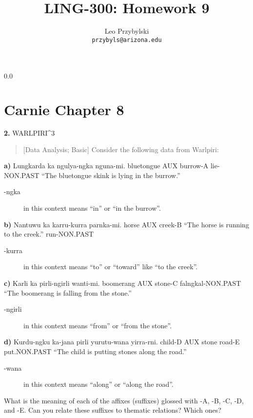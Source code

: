\documentclass[11pt,notitlepage]{article}
\title{LING-300: Homework 9}
\author{Leo Przybylski\\
\texttt{przybyls@arizona.edu}}
\newcommand{\question}[2]{\textbf{#1.} #2}
\newcommand{\subquestion}[2]{\par\hspace{0.5cm} \textbf{#1)} #2}
\begin{document}
  \maketitle
  {\setlength{\baselineskip}%
           {0.0\baselineskip}
  \section*{Carnie Chapter 8}
  \hrulefill \par}

\question{2}{WARLPIRI^3}
\begin{quote}[Data Analysis; Basic]
Consider the following data from Warlpiri:
\end{quote}

\subquestion{a}{Lungkarda ka ngulya-ngka nguna-mi. bluetongue AUX
  burrow-A lie-NON.PAST “The bluetongue skink is lying in the
  burrow.”}

\begin{description}
  \item [-ngka] in this context means ``in'' or ``in the burrow''.
\end{description}

\subquestion{b}{Nantuwu ka karru-kurra parnka-mi.}
horse AUX creek-B
“The horse is running to the creek.”
run-NON.PAST

\begin{description}
  \item [-kurra] in this context means ``to'' or ``toward'' like ``to
    the creek''.
\end{description}

\subquestion{c}{Karli ka pirli-ngirli wanti-mi. boomerang AUX stone-C falngkal-NON.PAST “The boomerang is falling from the stone.”}

\begin{description}
  \item [-ngirli] in this context means ``from'' or ``from the stone''.
\end{description}

\subquestion{d}{Kurdu-ngku ka-jana pirli yurutu-wana yirra-rni. child-D AUX stone road-E put.NON.PAST “The child is putting stones along the road.”}

\begin{description}
  \item [-wana] in this context means ``along'' or ``along the road''.
\end{description}


What is the meaning of each of the affixes (suffixes) glossed with -A,
-B, -C, -D, and -E. Can you relate these suffixes to thematic
relations? Which ones?
\end{document}
